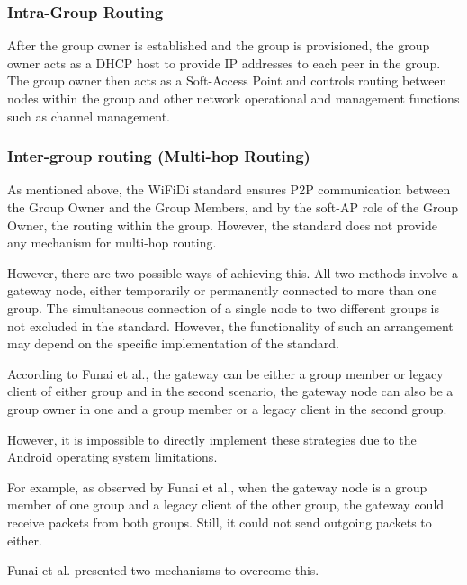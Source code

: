 \subsubsection{Intra-Group Routing}

After the group owner is established and the group is provisioned, the group
owner acts as a DHCP host to provide IP addresses to each peer in the
group\cite{funai2015}. The group owner then acts as a Soft-Access Point and
controls routing between nodes within the group and other network operational
and management functions such as channel management\cite{wifidispec}.

\subsubsection{Inter-group routing (Multi-hop Routing)}

As mentioned above, the WiFiDi standard ensures P2P communication between the
Group Owner and the Group Members, and by the soft-AP role of the Group Owner,
the routing within the group. However, the standard does not provide any
mechanism for multi-hop routing.

However, there are two possible ways of achieving this. All two methods involve
a gateway node, either temporarily or permanently connected to more than one
group. The simultaneous connection of a single node to two different groups is
not excluded in the standard. However, the functionality of such an arrangement
may depend on the specific implementation of the standard\cite{funai2015}.

According to Funai et al., the gateway can be either a group member or legacy
client of either group and in the second scenario, the gateway node can also be
a group owner in one and a group member or a legacy client in the second
group\cite{funai2015}.

However, it is impossible to directly implement these strategies due to the
Android operating system limitations.

For example, as observed by Funai et al., when the gateway node is a group
member of one group and a legacy client of the other group, the gateway could
receive packets from both groups. Still, it could not send outgoing packets to
either\cite{funai2015}.

Funai et al.\cite{funai2015} presented two mechanisms to overcome this.

